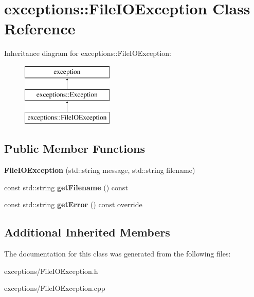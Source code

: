 \hypertarget{classexceptions_1_1FileIOException}{}\section{exceptions\+:\+:File\+I\+O\+Exception Class Reference}
\label{classexceptions_1_1FileIOException}
Inheritance diagram for exceptions\+:\+:File\+I\+O\+Exception\+:\begin{figure}[H]
\begin{center}
\leavevmode
\includegraphics[height=3.000000cm]{d5/da9/classexceptions_1_1FileIOException}
\end{center}
\end{figure}
\subsection*{Public Member Functions}
\begin{DoxyCompactItemize}
\item 
\mbox{\label{classexceptions_1_1FileIOException_ab561288a16a6e53e03304faa84442d8b}} 
{\bfseries File\+I\+O\+Exception} (std\+::string message, std\+::string filename)
\item 
\mbox{\label{classexceptions_1_1FileIOException_a9b1d1a131694d1e3c41b4d42fb11b449}} 
const std\+::string {\bfseries get\+Filename} () const
\item 
\mbox{\label{classexceptions_1_1FileIOException_a801fada59775c81ad5a2471f8bc5e360}} 
const std\+::string {\bfseries get\+Error} () const override
\end{DoxyCompactItemize}
\subsection*{Additional Inherited Members}


The documentation for this class was generated from the following files\+:\begin{DoxyCompactItemize}
\item 
exceptions/File\+I\+O\+Exception.\+h\item 
exceptions/File\+I\+O\+Exception.\+cpp\end{DoxyCompactItemize}
